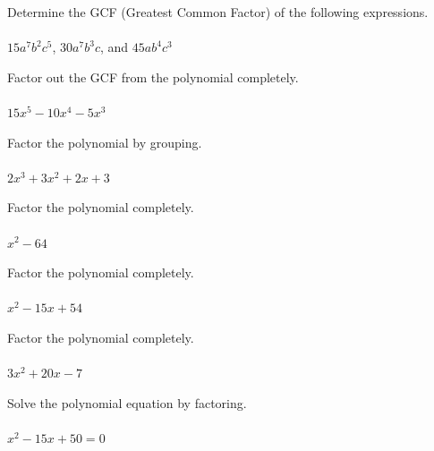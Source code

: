 \documentclass[addpoints,12pt,answers]{exam}
\begin{document}
\vspace{-.5cm}


\begin{questions}

\question[5] Determine the GCF (Greatest Common Factor) of the following expressions. \\ \\ $15a^7b^2c^5$, $30a^7b^3c$, and $45ab^4c^3$
\answerline

\newpage

\question[5] Factor out the GCF from the polynomial completely.\\ \\ $15x^5-10x^4-5x^3$
\answerline

\newpage

\question[5] Factor the polynomial by grouping.\\ \\ $2x^3+3x^2+2x+3$
\answerline

\newpage

\question[5] Factor the polynomial completely. \\ \\ $x^2-64$
\answerline

\newpage

\question[5] Factor the polynomial completely. \\ \\  $x^2-15x+54$
\answerline

\newpage

\question[5] Factor the polynomial completely. \\ \\   $3x^2+20x-7$
\answerline

\newpage

\question[5] Solve the polynomial equation by factoring.\\ \\ $x^2-15x+50=0$
\answerline


\end{questions}
\end{document}
